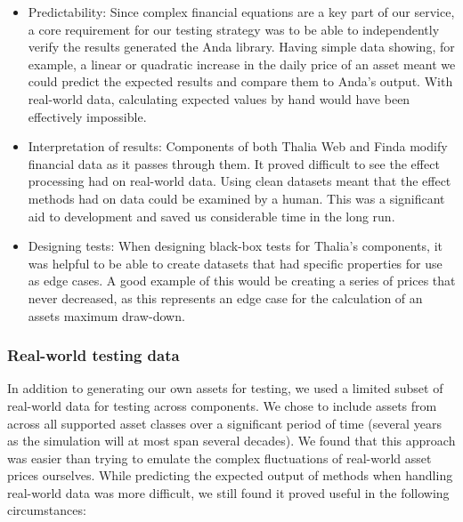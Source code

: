 \documentclass[main.tex]{subfiles}
\begin{document}
\begin{itemize}

\item Predictability:
Since complex financial equations are a key part of our service, a core requirement for our testing strategy was to be able to independently verify the results generated the Anda library. Having simple data showing, for example, a linear or quadratic increase in the daily price of an asset meant we could predict the expected results and compare them to Anda’s output. With real-world data, calculating expected values by hand would have been effectively impossible.

\item Interpretation of results:
Components of both Thalia Web and Finda modify financial data as it passes through them. It proved difficult to see the effect processing had on real-world data. Using clean datasets meant that the effect methods had on data could be examined by a human. This was a significant aid to development and saved us considerable time in the long run.

\item Designing tests:
When designing black-box tests for Thalia’s components, it was helpful to be able to create datasets that had specific properties for use as edge cases. A good example of this would be creating a series of prices that never decreased, as this represents an edge case for the calculation of an assets maximum draw-down.
\end{itemize}

\subsubsection{Real-world testing data}

In addition to generating our own assets for testing, we used a limited subset of real-world data for testing across components. We chose to include assets from across all supported asset classes over a significant period of time (several years as the simulation will at most span several decades). We found that this approach was easier than trying to emulate the complex fluctuations of real-world asset prices ourselves. While predicting the expected output of methods when handling real-world data was more difficult, we still found it proved useful in the following circumstances: 
\end{document}
